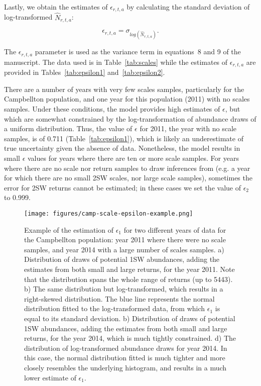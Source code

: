 \documentclass[12pt]{article}
\begin{document}
Lastly, we obtain the estimates of $\epsilon_{r,t,a}$ by calculating the standard deviation of log-transformed $\hat{N}_{r,t,a}$:

\begin{equation}
\epsilon_{r,t,a} = \sigma_{log(\hat{N}_{r,t,a})}.
\end{equation}

The $\epsilon_{r,t,a}$ parameter is used as the variance term in equations~8 and 9 of the manuscript.
The data used is in Table~\ref{tab:scales} while the estimates of $\epsilon_{r,t,a}$ are provided in Tables~\ref{tab:epsilon1} and~\ref{tab:epsilon2}.

There are a number of years with very few scales samples, particularly for the
Campbellton population, and one year for this population (2011) with no scales
samples. Under these conditions, the model provides high estimates of
$\epsilon$, but which are somewhat constrained by the log-transformation of
abundance draws of a uniform distribution. Thus, the value of $\epsilon$ for
2011, the year with no scale samples, is of 0.711 (Table~\ref{tab:epsilon1}),
which is likely an underestimate of true uncertainty given the absence of
data. Nonetheless, the model results in small $\epsilon$ values for years
where there are ten or more scale samples. 
For years where there are no scale nor return samples to draw inferences from (e.g. a year for which there are no small 2SW scales, nor large scale samples),
sometimes the error for 2SW returns cannot be estimated; in these cases we set the value of $\epsilon_{2}$ to 0.999.

\begin{figure}[htbp] \centering
    \texttt{[image: figures/camp-scale-epsilon-example.png]} \caption{Example
        of the estimation of $\epsilon_{1}$ for two different years of data for the Campbellton population: year 2011 where
        there were no scale samples, and year 2014 with a large number of scales samples. a) Distribution of draws of potential
    1SW abundances, adding the estimates from both small and large returns, for the year 2011. Note that the distribution spans the whole range of
returns (up to 5443). b) The same distribution but log-transformed, which results in a right-skewed distribution. The blue line represents the normal
distribution fitted to the log-transformed data, from which $\epsilon_{1}$ is equal to its standard deviation. b) Distribution of draws of potential
    1SW abundances, adding the estimates from both small and large returns, for the year 2014, which is much tightly constrained. d) The distribution
of log-transformed abundance draws for year 2014. In this case, the normal distribution fitted is much tighter and more closely resembles the underlying histogram,
and results in a much lower estimate of $\epsilon_{1}$.}
    \label{fig:priors} 
\end{figure}
\end{document}
